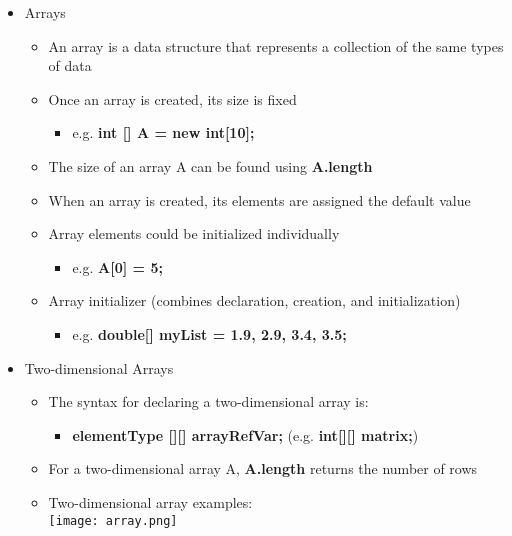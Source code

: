 \begin{itemize}
	\item Arrays
	\begin{itemize}
		\item An array is a data structure that represents a collection of the same types of data
		\item Once an array is created, its size is fixed
		\begin{itemize}
			\item e.g. \textbf{int [] A = new int[10];}
		\end{itemize}
		\item The size of an array A can be found using \textbf{A.length}
		\item When an array is created, its elements are assigned the default value
		\item Array elements could be initialized individually
		\begin{itemize}
			\item e.g. \textbf{A[0] = 5;}
		\end{itemize}
		\item Array initializer (combines declaration, creation, and initialization)
		\begin{itemize}
			\item e.g. \textbf{double[] myList = {1.9, 2.9, 3.4, 3.5};}
		\end{itemize}
	\end{itemize}

	\item Two-dimensional Arrays
	\begin{itemize}
		\item The syntax for declaring a two-dimensional array is:
		\begin{itemize}
			\item \textbf{elementType [][] arrayRefVar;} (e.g. \textbf{int[][] matrix;})
		\end{itemize}
		\item For a two-dimensional array A, \textbf{A.length} returns the number of rows
		\item Two-dimensional array examples:\\
		\texttt{[image: array.png]}
	\end{itemize}
\end{itemize}